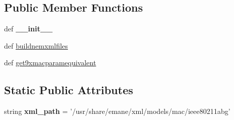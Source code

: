\subsection*{Public Member Functions}
\begin{DoxyCompactItemize}
\item 
\hypertarget{classcore_1_1emane_1_1ieee80211abg_1_1_emane_ieee80211abg_model_a6f1588d42d5311dffdf7da84b2ab3f7b}{def {\bfseries \+\_\+\+\_\+init\+\_\+\+\_\+}}\label{classcore_1_1emane_1_1ieee80211abg_1_1_emane_ieee80211abg_model_a6f1588d42d5311dffdf7da84b2ab3f7b}

\item 
def \hyperlink{classcore_1_1emane_1_1ieee80211abg_1_1_emane_ieee80211abg_model_a506082797e5179bb62b94b0b1101f1ad}{buildnemxmlfiles}
\item 
def \hyperlink{classcore_1_1emane_1_1ieee80211abg_1_1_emane_ieee80211abg_model_a13cf7522474198eb83646f9d0d2135ff}{get9xmacparamequivalent}
\end{DoxyCompactItemize}
\subsection*{Static Public Attributes}
\begin{DoxyCompactItemize}
\item 
\hypertarget{classcore_1_1emane_1_1ieee80211abg_1_1_emane_ieee80211abg_model_a667146008f5396af6b2094dbeeebebef}{string {\bfseries xml\+\_\+path} = '/usr/share/emane/xml/models/mac/ieee80211abg'}\label{classcore_1_1emane_1_1ieee80211abg_1_1_emane_ieee80211abg_model_a667146008f5396af6b2094dbeeebebef}

\end{DoxyCompactItemize}


